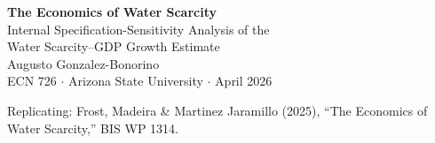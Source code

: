\documentclass[aspectratio=169,12pt]{beamer}
\begin{document}

\begin{frame}
\vspace{1.5cm}
\begin{center}
{\Large\color{waterdark}\textbf{The Economics of Water Scarcity}}\\[6pt]
{\normalsize Internal Specification-Sensitivity Analysis of the\\Water Scarcity--GDP Growth Estimate}\\[16pt]
{\small Augusto Gonzalez-Bonorino}\\[4pt]
{\footnotesize ECN 726 $\cdot$ Arizona State University $\cdot$ April 2026}
\end{center}
\vfill
{\footnotesize Replicating: Frost, Madeira \& Martinez Jaramillo (2025), ``The Economics of Water Scarcity,'' BIS WP 1314.}
\end{frame}
\end{document}
